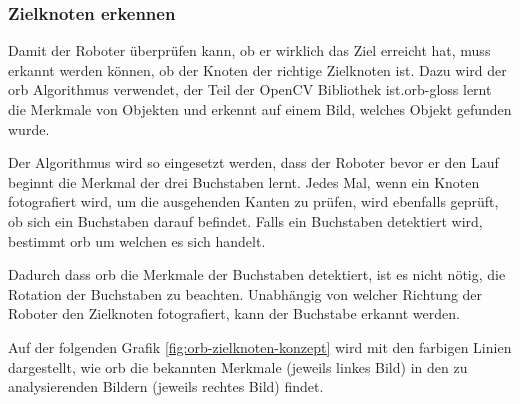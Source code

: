 \subsubsection{Zielknoten erkennen}

Damit der Roboter überprüfen kann, ob er wirklich das Ziel erreicht hat, muss erkannt werden können, ob der Knoten der richtige Zielknoten ist. Dazu wird der \acrfull{orb} Algorithmus verwendet, der Teil der OpenCV Bibliothek ist.\gls{orb-gloss} lernt die Merkmale von Objekten und erkennt auf einem Bild, welches Objekt gefunden wurde.

Der Algorithmus wird so eingesetzt werden, dass der Roboter bevor er den Lauf beginnt die Merkmal der drei Buchstaben lernt. Jedes Mal, wenn ein Knoten fotografiert wird, um die ausgehenden Kanten zu prüfen, wird ebenfalls geprüft, ob sich ein Buchstaben darauf befindet. Falls ein Buchstaben detektiert wird, bestimmt \acrshort{orb} um welchen es sich handelt.

Dadurch dass \acrshort{orb} die Merkmale der Buchstaben detektiert, ist es nicht nötig, die Rotation der Buchstaben zu beachten. Unabhängig von welcher Richtung der Roboter den Zielknoten fotografiert, kann der Buchstabe erkannt werden.

Auf der folgenden Grafik \ref{fig:orb-zielknoten-konzept} wird mit den farbigen Linien dargestellt, wie \acrshort{orb} die bekannten Merkmale (jeweils linkes Bild) in den zu analysierenden Bildern (jeweils rechtes Bild) findet.

